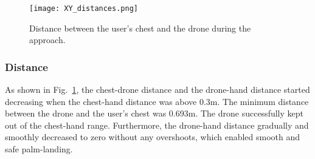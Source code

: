 \begin{figure}[!b]
  \centering
  \texttt{[image: XY\_distances.png]}
  \caption{Distance between the user's chest and the drone during the approach.}
  \label{fig:simple_hand_landing_xy_distances}
\end{figure}
\subsubsection{Distance}
As shown in Fig.~\ref{fig:simple_hand_landing_xy_distances}, the chest-drone distance and the drone-hand distance started decreasing 
when the chest-hand distance was above 0.3m.
The minimum distance between the drone and the user's chest was 0.693m.
The drone successfully kept out of the chest-hand range.
Furthermore, the drone-hand distance gradually and smoothly decreased to zero without any overshoots,
which enabled smooth and safe palm-landing.

